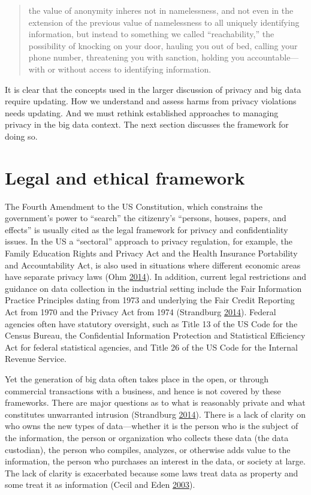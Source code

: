 \documentclass[]{krantz}
\begin{document}
\begin{quote}
the value of anonymity inheres not in namelessness, and not even in the
extension of the previous value of namelessness to all uniquely
identifying information, but instead to something we called
``reachability,'' the possibility of knocking on your door, hauling you
out of bed, calling your phone number, threatening you with sanction,
holding you accountable---with or without access to identifying
information.
\end{quote}

It is clear that the concepts used in the larger discussion of privacy
and big data require updating. How we understand and assess harms from
privacy violations needs updating. And we must rethink established
approaches to managing privacy in the big data context. The next section
discusses the framework for doing so.

\section{Legal and ethical framework}\label{legal-and-ethical-framework}

The Fourth Amendment to the US Constitution, which constrains the
government's power to ``search'' the citizenry's ``persons, houses,
papers, and effects'' is usually cited as the legal framework for
privacy and confidentiality issues. In the US a ``sectoral'' approach to
privacy regulation, for example, the Family Education Rights and Privacy
Act and the Health Insurance Portability and Accountability Act, is also
used in situations where different economic areas have separate privacy
laws (Ohm \protect\hyperlink{ref-Ohm2014}{2014}). In addition, current
legal restrictions and guidance on data collection in the industrial
setting include the Fair Information Practice Principles dating from
1973 and underlying the Fair Credit Reporting Act from 1970 and the
Privacy Act from 1974 (Strandburg
\protect\hyperlink{ref-Strandburg2014}{2014}). Federal agencies often
have statutory oversight, such as Title 13 of the US Code for the Census
Bureau, the Confidential Information Protection and Statistical
Efficiency Act for federal statistical agencies, and Title 26 of the US
Code for the Internal Revenue Service.

Yet the generation of big data often takes place in the open, or through
commercial transactions with a business, and hence is not covered by
these frameworks. There are major questions as to what is reasonably
private and what constitutes unwarranted intrusion (Strandburg
\protect\hyperlink{ref-Strandburg2014}{2014}). There is a lack of
clarity on who owns the new types of data---whether it is the person who
is the subject of the information, the person or organization who
collects these data (the data custodian), the person who compiles,
analyzes, or otherwise adds value to the information, the person who
purchases an interest in the data, or society at large. The lack of
clarity is exacerbated because some laws treat data as property and some
treat it as information (Cecil and Eden
\protect\hyperlink{ref-Cecil2003}{2003}).
\end{document}
